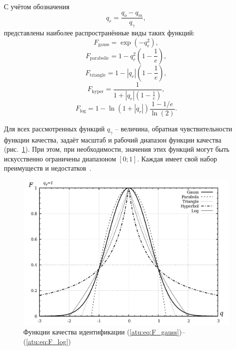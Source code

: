 С учётом обозначения
%
\[
  q_r = \frac{q_o - q_m}{q_\gamma},
\]
%
\noindent
представлены наиболее распространённые виды таких функций:
%
\begin{equation}
  F_{\mathrm{gauss}} = \exp( - q_r^2 ),
\label{atu:eq:F_gauss}
\end{equation}
%
\begin{equation}
  F_{\mathrm{parabolic}} = 1 - q_r^2 \left( 1 - \frac{1}{e} \right),
\label{atu:eq:F_parabolic}
\end{equation}
%
\begin{equation}
  F_{\mathrm{triangle}} = 1 - |q_r| \left( 1 - \frac{1}{e} \right),
\label{atu:eq:F_triangle}
\end{equation}
%
\begin{equation}
  F_{\mathrm{hyper}} = \frac{1}{ 1 + |q_r| \left( 1 - \frac{1}{e} \right)},
\label{atu:eq:F_hyper}
\end{equation}
%
\begin{equation}
  F_{\mathrm{log}} = 1 - \ln \left( 1 + |q_r| \right) \frac{1-1/e}{\ln(2)}.
\label{atu:eq:F_log}
\end{equation}

Для всех рассмотренных функций $q_\gamma$ -- величина, обратная чувствительности
функции качества, задаёт масштаб и рабочий диапазон функции качества (рис.~\ref{atu:f:F_types}).
При этом, при необходимости, значения этих функций могут быть искусственно ограничены диапазоном $[0;1]$.
Каждая имеет свой набор преимуществ и недостатков~\cite{atu_ISDMCI2016}.

\begin{figure}[htb!]
  \centerline{\includegraphics[width=45\TW]{p/F_types.png} }
  \caption{Функции качества идентификации (\ref{atu:eq:F_gauss})--(\ref{atu:eq:F_log})}
  \label{atu:f:F_types}
\end{figure}

